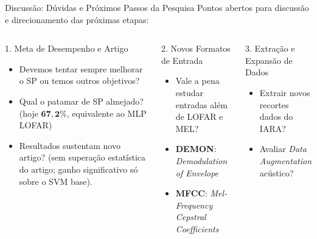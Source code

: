 \documentclass[aspectratio=169]{beamer}
\begin{document}
\begin{frame}{Discuss\~{a}o: D\'{u}vidas e Pr\'{o}ximos Passos da Pesquisa}
    \footnotesize
    Pontos abertos para discuss\~{a}o e direcionamento das pr\'{o}ximas etapas:

    \vspace{0.02cm}
    \begin{columns}[t]
        \begin{block}{\small 1. Meta de Desempenho e Artigo}
            \scriptsize
            \begin{itemize}
                \setlength{\itemsep}{0pt}
                \item Devemos tentar sempre melhorar o SP ou temos outros objetivos? 
                \item Qual o patamar de SP almejado? (hoje $\mathbf{67,2\%}$, equivalente ao MLP LOFAR)
                \item Resultados sustentam novo artigo? (sem supera\c{c}\~{a}o estat\'{i}stica do artigo; ganho significativo s\'{o} sobre o SVM base).
            \end{itemize}
        \end{block}

        \vspace{0.02cm}
        \begin{block}{\small 2. Novos Formatos de Entrada}
            \scriptsize
            \begin{itemize}
                \setlength{\itemsep}{0pt}
                \item Vale a pena estudar entradas al\'{e}m de LOFAR e MEL?
                \item \textbf{DEMON}: \textit{Demodulation of Envelope}
                \item \textbf{MFCC}: \textit{Mel-Frequency Cepstral Coefficients}
            \end{itemize}
        \end{block}

        \begin{block}{\small 3. Extra\c{c}\~{a}o e Expans\~{a}o de Dados}
            \scriptsize
            \begin{itemize}
                \setlength{\itemsep}{0pt}
                \item Extrair novos recortes dados do IARA?
                \item Avaliar \textit{Data Augmentation} ac\'{u}stico?
            \end{itemize}
        \end{block}


\end{columns}
\end{frame}
\end{document}
